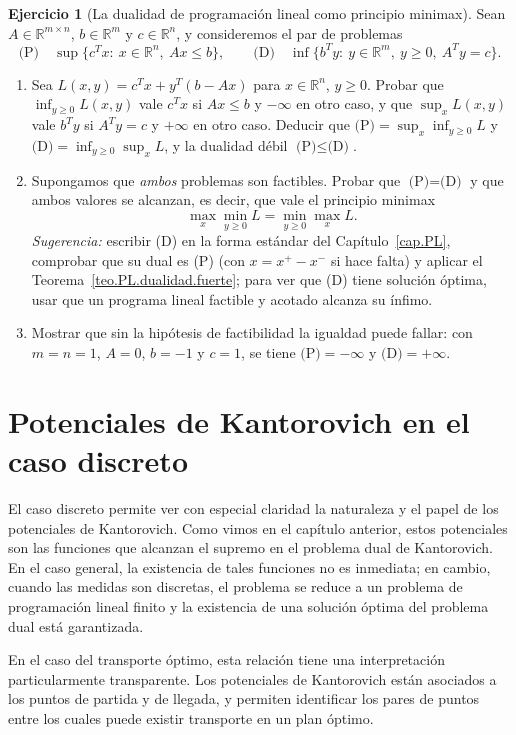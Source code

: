 \documentclass[12pt, a4paper]{amsbook}
\newcommand{\R}{{\mathbb R}}
\theoremstyle{remark}
\theoremstyle{definition}
\newtheorem{ejercicio}{Ejercicio}[chapter]
\numberwithin{section}{chapter}
\numberwithin{subsection}{section}
\numberwithin{equation}{section}
\numberwithin{figure}{chapter}
\begin{document}
\begin{ejercicio}[La dualidad de programación lineal como principio minimax]\label{ejer.PL.minimax}
Sean $A\in\R^{m\times n}$, $b\in\R^m$ y $c\in\R^n$, y consideremos el par de
problemas
\[
\text{(P)}\quad\sup\{c^Tx:\ x\in\R^n,\ Ax\le b\},
\qquad
\text{(D)}\quad\inf\{b^Ty:\ y\in\R^m,\ y\ge0,\ A^Ty=c\}.
\]
\begin{enumerate}[label=(\alph*)]
\item Sea $L(x,y)=c^Tx+y^T(b-Ax)$ para $x\in\R^n$, $y\ge0$. Probar que
$\inf_{y\ge0}L(x,y)$ vale $c^Tx$ si $Ax\le b$ y $-\infty$ en otro caso, y que
$\sup_xL(x,y)$ vale $b^Ty$ si $A^Ty=c$ y $+\infty$ en otro caso. Deducir que
$\text{(P)}=\sup_x\inf_{y\ge0}L$ y $\text{(D)}=\inf_{y\ge0}\sup_xL$, y la
dualidad débil $\text{(P)}\le\text{(D)}$.
\item Supongamos que \emph{ambos} problemas son factibles. Probar que
$\text{(P)}=\text{(D)}$ y que ambos valores se alcanzan, es decir, que vale el
principio minimax
\[
\max_x\min_{y\ge0}L=\min_{y\ge0}\max_xL.
\]
\emph{Sugerencia:} escribir (D) en la forma estándar del
Capítulo~\ref{cap.PL}, comprobar que su dual es (P) (con $x=x^+-x^-$ si hace
falta) y aplicar el Teorema~\ref{teo.PL.dualidad.fuerte}; para ver que (D)
tiene solución óptima, usar que un programa lineal factible y acotado
alcanza su ínfimo.
\item Mostrar que sin la hipótesis de factibilidad la igualdad puede fallar:
con $m=n=1$, $A=0$, $b=-1$ y $c=1$, se tiene $\text{(P)}=-\infty$ y
$\text{(D)}=+\infty$.
\end{enumerate}
\end{ejercicio}

\chapter{Potenciales de Kantorovich en el caso discreto}\label{cap.dual.discreto}

El caso discreto permite ver con especial claridad la naturaleza y el papel de los potenciales de Kantorovich. Como vimos en el capítulo anterior, estos potenciales son las funciones que alcanzan el supremo en el problema dual de Kantorovich. En el caso general, la existencia de tales funciones no es inmediata; en cambio, cuando las medidas son discretas, el problema se reduce a un problema de programación lineal finito y la existencia de una solución óptima del problema dual está garantizada.

En el caso del transporte óptimo, esta relación tiene una interpretación particularmente transparente. Los potenciales de Kantorovich están asociados a los puntos de partida y de llegada, y permiten identificar los pares de puntos entre los cuales puede existir transporte en un plan óptimo.
\end{document}
